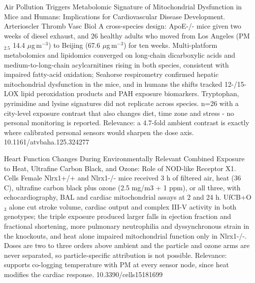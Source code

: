 \documentclass[10pt]{article}
\begin{document}

{Air Pollution Triggers Metabolomic Signature of Mitochondrial Dysfunction in Mice and Humans: Implications for Cardiovascular Disease Development.}
{Arterioscler Thromb Vasc Biol}
{A cross-species design: ApoE-/- mice given two weeks of diesel exhaust, and 26 healthy adults who moved from Los Angeles (PM$_{2.5}$ 14.4 $\mu$g\,m$^{-3}$) to Beijing (67.6 $\mu$g\,m$^{-3}$) for ten weeks. Multi-platform metabolomics and lipidomics converged on long-chain dicarboxylic acids and medium-to-long-chain acylcarnitines rising in both species, consistent with impaired fatty-acid oxidation; Seahorse respirometry confirmed hepatic mitochondrial dysfunction in the mice, and in humans the shifts tracked 12-/15-LOX lipid peroxidation products and PAH exposure biomarkers. Tryptophan, pyrimidine and lysine signatures did not replicate across species. n=26 with a city-level exposure contrast that also changes diet, time zone and stress - no personal monitoring is reported. Relevance: a 4.7-fold ambient contrast is exactly where calibrated personal sensors would sharpen the dose axis.}
{10.1161/atvbaha.125.324277}

{Heart Function Changes During Environmentally Relevant Combined Exposure to Heat, Ultrafine Carbon Black, and Ozone: Role of NOD-like Receptor X1.}
{Cells}
{Female Nlrx1+/+ and Nlrx1-/- mice received 3 h of filtered air, heat (36 C), ultrafine carbon black plus ozone (2.5 mg/m3 + 1 ppm), or all three, with echocardiography, BAL and cardiac mitochondrial assays at 2 and 24 h. UfCB+O$_3$ alone cut stroke volume, cardiac output and complex III-V activity in both genotypes; the triple exposure produced larger falls in ejection fraction and fractional shortening, more pulmonary neutrophilia and dyssynchronous strain in the knockouts, and heat alone impaired mitochondrial function only in Nlrx1-/-. Doses are two to three orders above ambient and the particle and ozone arms are never separated, so particle-specific attribution is not possible. Relevance: supports co-logging temperature with PM at every sensor node, since heat modifies the cardiac response.}
{10.3390/cells15181699}
\end{document}
